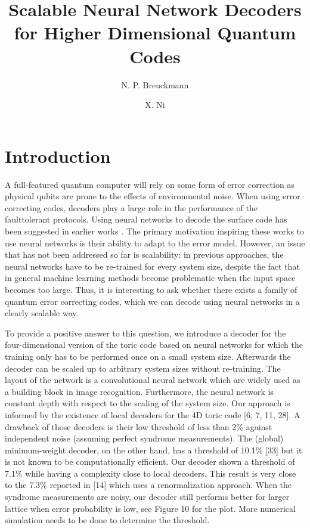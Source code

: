 \documentclass[]{compositionalityarticle}
\title{Scalable Neural Network Decoders for Higher Dimensional Quantum Codes}
\author[1]{N. P. Breuckmann}
\author[1,2]{X. Ni}
\affil[1]{Institute for Quantum Information, RWTH Aachen University, Germany}
\affil[2]{Max Planck Institute of Quantum Optics, Germany}
\begin{document}
\maketitle

\section{Introduction}

A full-featured quantum computer will rely on some form of error correction as physical qubits are prone to the effects of environmental noise. When using error correcting codes, decoders play a large role in the performance of the faulttolerant protocols. Using neural networks to decode the surface code has been suggested in earlier works \cite{beaz2017reactionnetworks}. The primary motivation inspiring these works to use neural networks is their ability to adapt to the error model. However, an issue that has not been addressed so far is scalability: in previous approaches, the neural networks have to be re-trained for every system size, despite the fact that in general machine learning methods become problematic when the input space becomes too large. Thus, it is interesting to ask whether there exists a family of quantum error correcting codes, which we can decode using neural networks in a clearly scalable way.

To provide a positive answer to this question, we introduce a decoder for the four-dimensional version of the toric code based on neural networks for which the training only has to be performed once on a small system size. Afterwards the decoder can be scaled up to arbitrary system sizes without re-training. The layout of the network is a convolutional neural network which are widely used as a building block in image recognition. Furthermore, the neural network is constant depth with respect to
the scaling of the system size. Our approach is informed by the existence of local decoders for the 4D toric code [6, 7, 11, 28]. A drawback of those decoders is their low threshold of less than 2\% against independent noise (assuming perfect syndrome measurements). The (global) minimum-weight decoder, on the other hand, has a threshold of 10.1\% [33] but it is not known to be computationally efficient. Our decoder shown a threshold of 7.1\% while having a complexity close to local decoders.
This result is very close to the 7.3\% reported in [14] which uses a renormalization approach. When the syndrome measurements are noisy, our decoder still performs better for larger lattice when error probability is low, see Figure 10 for the plot. More numerical simulation needs to be done to determine the threshold. 
\end{document}
